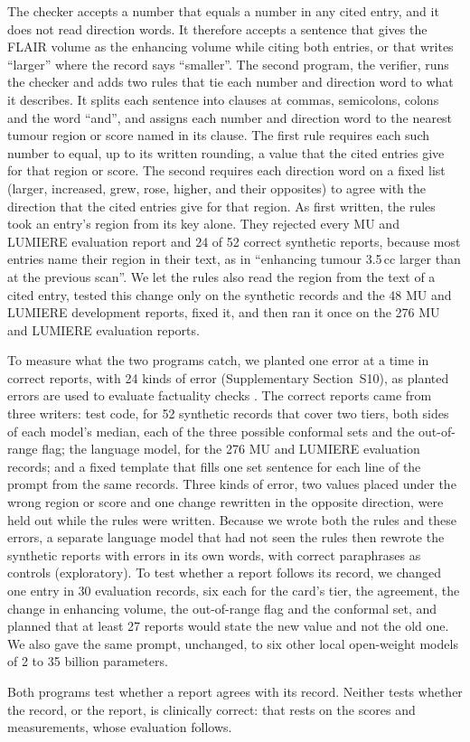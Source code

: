 The checker accepts a number that equals a number in any cited entry, and it does not read direction words. It
therefore accepts a sentence that gives the FLAIR volume as the enhancing volume while citing both entries, or that
writes ``larger'' where the record says ``smaller''. The second program, the verifier, runs the checker and adds two
rules that tie each number and direction word to what it describes. It splits each sentence into clauses at commas,
semicolons, colons and the word ``and'', and assigns each number and direction word to the nearest tumour region or
score named in its clause. The first rule requires each such number to equal, up to its written rounding, a value that
the cited entries give for that region or score. The second requires each direction word on a fixed list (larger,
increased, grew, rose, higher, and their opposites) to agree with the direction that the cited entries give for that
region. As first written, the rules took an entry's region from its key alone. They rejected every MU and LUMIERE
evaluation report and 24 of 52 correct synthetic reports, because most entries name their region in their text, as in
``enhancing tumour 3.5\,cc larger than at the previous scan''. We let the rules also read the region from the text of a
cited entry, tested this change only on the synthetic records and the 48 MU and LUMIERE development reports, fixed it,
and then ran it once on the 276 MU and LUMIERE evaluation reports.

To measure what the two programs catch, we planted one error at a time in correct reports, with 24 kinds of error
(Supplementary Section~S10), as planted errors are used to evaluate factuality checks \citep{gabriel2021,rao2025rexerr}.
The correct reports came from three writers: test code, for 52 synthetic records that cover two tiers, both sides of
each model's median, each of the three possible conformal sets and the out-of-range flag; the language model, for the
276 MU and LUMIERE evaluation records; and a fixed template that fills one set sentence for each line of the prompt
from the same records. Three kinds of error, two values placed under the wrong region or score and one change
rewritten in the opposite direction, were held out while the rules were written. Because we wrote both the rules and
these errors, a separate language model that had not seen the rules then rewrote the synthetic reports with errors in
its own words, with correct paraphrases as controls (exploratory). To test whether a report follows its record, we
changed one entry in 30 evaluation records, six each for the card's tier, the agreement, the change in enhancing
volume, the out-of-range flag and the conformal set, and planned that at least 27 reports would state the new value
and not the old one. We also gave the same prompt, unchanged, to six other local open-weight models of 2 to 35 billion
parameters.

Both programs test whether a report agrees with its record. Neither tests whether the record, or the report, is
clinically correct: that rests on the scores and measurements, whose evaluation follows.
